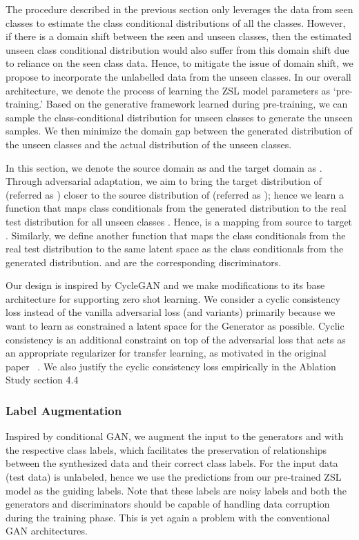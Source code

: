 \documentclass[10pt,twocolumn,letterpaper]{article}
\begin{document}
The procedure described in the previous section only leverages the data from seen classes to estimate the class conditional distributions of all the classes. However, if there is a domain shift between the seen and unseen classes, then the estimated unseen class conditional distribution would also suffer from this domain shift due to reliance on the seen class data. Hence, to mitigate the issue of domain shift,  we propose to incorporate the unlabelled data from the unseen classes. In our overall architecture, we denote the process of learning the ZSL model parameters  as `pre-training.' Based on the generative framework learned during pre-training, we can sample the class-conditional distribution for unseen classes to generate the unseen samples. We then minimize the domain gap between the generated distribution of the unseen classes and the actual distribution of the unseen classes. 

In this section, we denote the source domain as  and the target domain as . Through adversarial adaptation, we aim to bring the target distribution of  (referred as ) closer to the source distribution  of  (referred as ); hence we learn a function  that maps class conditionals from the generated distribution  to the real test distribution  for all unseen classes . Hence,  is a mapping from source  to target . Similarly, we define another function  that maps the class conditionals from the real test distribution to the same latent space as the class conditionals from the generated distribution.  and  are the corresponding discriminators.

Our design is inspired by CycleGAN \cite{cyclegan} and we make modifications to its base architecture for supporting zero shot learning. We consider a cyclic consistency loss instead of the vanilla adversarial loss (and variants) primarily because we want to learn as constrained a latent space for the Generator as possible. Cyclic consistency is an additional constraint on top of the adversarial loss that acts as an appropriate regularizer for transfer learning, as motivated in the original paper~\cite{cyclegan} . We also justify the cyclic consistency loss empirically in the Ablation Study section 4.4


\subsubsection{Label Augmentation}
Inspired by conditional GAN\cite{conGAN}, we augment the input to the generators  and  with the respective class labels, which facilitates the preservation of relationships between the synthesized data and their correct class labels. For  the input data (test data) is unlabeled, hence we use the predictions from our pre-trained ZSL model as the guiding labels. Note that these labels are noisy labels and both the generators and discriminators should be capable of handling data corruption during the training phase. This is yet again a problem with the conventional GAN architectures. 
\end{document}
